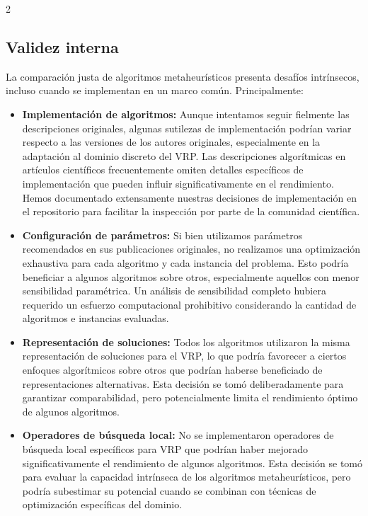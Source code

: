 \documentclass[10pt,a4paper]{extarticle}
\begin{document}
\begin{table}[!htbp]
\begin{multicols}{2}
\subsection{Validez interna}
La comparación justa de algoritmos metaheurísticos presenta desafíos intrínsecos, incluso cuando se implementan en un marco común. Principalmente:
\begin{itemize}
\item \textbf{Implementación de algoritmos:} Aunque intentamos seguir fielmente las descripciones originales, algunas sutilezas de implementación podrían variar respecto a las versiones de los autores originales, especialmente en la adaptación al dominio discreto del VRP. Las descripciones algorítmicas en artículos científicos frecuentemente omiten detalles específicos de implementación que pueden influir significativamente en el rendimiento. Hemos documentado extensamente nuestras decisiones de implementación en el repositorio para facilitar la inspección por parte de la comunidad científica.
\item \textbf{Configuración de parámetros:} Si bien utilizamos parámetros recomendados en sus publicaciones originales, no realizamos una optimización exhaustiva para cada algoritmo y cada instancia del problema. Esto podría beneficiar a algunos algoritmos sobre otros, especialmente aquellos con menor sensibilidad paramétrica. Un análisis de sensibilidad completo hubiera requerido un esfuerzo computacional prohibitivo considerando la cantidad de algoritmos e instancias evaluadas.
\item \textbf{Representación de soluciones:} Todos los algoritmos utilizaron la misma representación de soluciones para el VRP, lo que podría favorecer a ciertos enfoques algorítmicos sobre otros que podrían haberse beneficiado de representaciones alternativas. Esta decisión se tomó deliberadamente para garantizar comparabilidad, pero potencialmente limita el rendimiento óptimo de algunos algoritmos.
\item \textbf{Operadores de búsqueda local:} No se implementaron operadores de búsqueda local específicos para VRP que podrían haber mejorado significativamente el rendimiento de algunos algoritmos. Esta decisión se tomó para evaluar la capacidad intrínseca de los algoritmos metaheurísticos, pero podría subestimar su potencial cuando se combinan con técnicas de optimización específicas del dominio.
\end{itemize}


\end{multicols}
\end{table}
\end{document}
